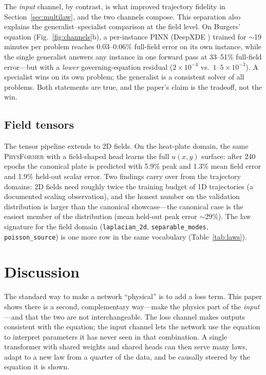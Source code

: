 \documentclass[11pt,a4paper]{article}
\newcommand{\PT}{{\scshape PhysFormer}}
\begin{document}
The \emph{input} channel, by contrast, is what improved trajectory fidelity
in Section~\ref{sec:multilaw}, and the two channels compose. This separation
also explains the generalist--specialist comparison at the field level. On
Burgers' equation (Fig.~\ref{fig:channels}b), a per-instance PINN
(DeepXDE \cite{lu2021deepxde}) trained for $\sim$19 minutes per problem
reaches 0.03--0.06\% full-field error on its own instance, while the single
generalist answers any instance in one forward pass at 33--51\% full-field
error---but with a \emph{lower} governing-equation residual
($2\times10^{-4}$ vs.\ $1$--$5\times10^{-3}$). A specialist wins on its own
problem; the generalist is a consistent solver of all problems. Both
statements are true, and the paper's claim is the tradeoff, not the win.

\subsection{Field tensors}
\label{sec:fields}

The tensor pipeline extends to 2D fields. On the heat-plate domain, the same
\PT{} with a field-shaped head learns the full $u(x,y)$ surface: after 240
epochs the canonical plate is predicted with 5.9\% peak and 1.3\% mean
field error and 1.9\% held-out scalar error. Two findings carry over from the
trajectory domains: 2D fields need roughly twice the training budget of 1D
trajectories (a documented scaling observation), and the honest number on the
validation distribution is larger than the canonical showcase---the canonical
case is the easiest member of the distribution (mean held-out peak error
$\sim$29\%). The law signature for the field domain (\texttt{laplacian\_2d},
\texttt{separable\_modes}, \texttt{poisson\_source}) is one more row in the
same vocabulary (Table~\ref{tab:laws}).

\section{Discussion}
\label{sec:discussion}

The standard way to make a network ``physical'' is to add a loss term. This
paper shows there is a second, complementary way---make the physics part of
the \emph{input}---and that the two are not interchangeable. The loss channel
makes outputs consistent with the equation; the input channel lets the network
use the equation to interpret parameters it has never seen in that
combination. A single transformer with shared weights and shared heads can
then serve many laws, adapt to a new law from a quarter of the data, and be
causally steered by the equation it is shown.
\end{document}
